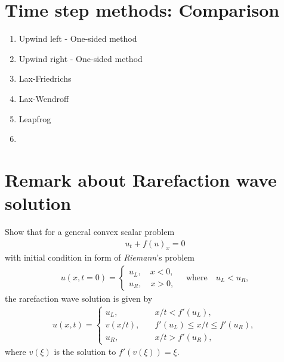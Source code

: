\documentclass[12pt]{article}
\begin{document}


\section{Time step methods: Comparison}
\begin{enumerate}
	\item Upwind left - One-sided method
	\item Upwind right - One-sided method
	\item Lax-Friedrichs
	\item Lax-Wendroff
	\item Leapfrog
	\item 
\end{enumerate}

\section{Remark about Rarefaction wave solution}
\begin{example}
	Show that for a general convex scalar problem 
	\begin{align*}
		u_t + f(u)_x = 0	
	\end{align*}
	with initial condition
	in form of \emph{Riemann}'s problem 
	\begin{align*}
		u(x,t=0) = 
		\begin{cases}
			u_L, \quad x<0, \\
			u_R, \quad x>0,
		\end{cases}
		\quad\text{where}\quad
		u_L<u_R,
	\end{align*}
	the rarefaction wave solution
	is given by 
	\begin{align*}
		u(x,t) =
		\begin{cases} 
			u_L,    & \quad x/t < f'(u_L),                 \\
			v(x/t), & \quad f'(u_L) \leq x/t \leq f'(u_R), \\
			u_R,    & \quad x/t > f'(u_R),
		\end{cases}
	\end{align*}
	where $v(\xi)$ is the solution to $f'(v(\xi)) = \xi$.
\end{example}
\end{document}
